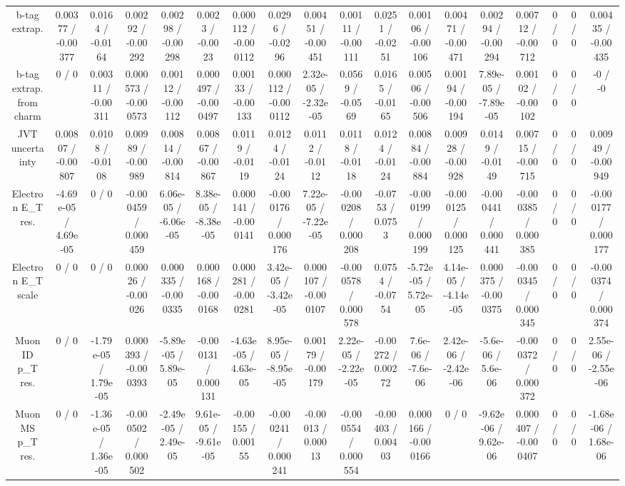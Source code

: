 \documentclass[10pt]{article}
\begin{document}
\begin{table}[htbp]
\begin{center}
\begin{tabular}{|c|c|c|c|c|c|c|c|c|c|c|c|c|c|c|c|c|c|}
  b-tag extrap. & 0.00377 / -0.00377 & 0.0164 / -0.0164 & 0.00292 / -0.00292 & 0.00298 / -0.00298 & 0.0023 / -0.0023 & 0.000112 / -0.000112 & 0.0296 / -0.0296 & 0.00451 / -0.00451 & 0.00111 / -0.00111 & 0.0251 / -0.0251 & 0.00106 / -0.00106 & 0.00471 / -0.00471 & 0.00294 / -0.00294 & 0.00712 / -0.00712 & 0 / 0 & 0 / 0 & 0.00435 / -0.00435 \\ 
  b-tag extrap. from charm & 0 / 0 & 0.00311 / -0.00311 & 0.000573 / -0.000573 & 0.00112 / -0.00112 & 0.000497 / -0.000497 & 0.00133 / -0.00133 & 0.000112 / -0.000112 & 2.32e-05 / -2.32e-05 & 0.0569 / -0.0569 & 0.0165 / -0.0165 & 0.00506 / -0.00506 & 0.00194 / -0.00194 & 7.89e-05 / -7.89e-05 & 0.00102 / -0.00102 & 0 / 0 & 0 / 0 & -0 / -0 \\ 
  JVT uncertainty & 0.00807 / -0.00807 & 0.0108 / -0.0108 & 0.00989 / -0.00989 & 0.00814 / -0.00814 & 0.00867 / -0.00867 & 0.0119 / -0.0119 & 0.0124 / -0.0124 & 0.0112 / -0.0112 & 0.0118 / -0.0118 & 0.0124 / -0.0124 & 0.00884 / -0.00884 & 0.00928 / -0.00928 & 0.0149 / -0.0149 & 0.00715 / -0.00715 & 0 / 0 & 0 / 0 & 0.00949 / -0.00949 \\ 
  Electron E_{T} res. & -4.69e-05 / 4.69e-05 & 0 / 0 & -0.000459 / 0.000459 & 6.06e-05 / -6.06e-05 & 8.38e-05 / -8.38e-05 & 0.000141 / -0.000141 & -0.000176 / 0.000176 & 7.22e-05 / -7.22e-05 & -0.000208 / 0.000208 & -0.0753 / 0.0753 & -0.000199 / 0.000199 & -0.000125 / 0.000125 & -0.000441 / 0.000441 & -0.000385 / 0.000385 & 0 / 0 & 0 / 0 & -0.000177 / 0.000177 \\ 
  Electron E_{T} scale & 0 / 0 & 0 / 0 & 0.00026 / -0.00026 & 0.000335 / -0.000335 & 0.000168 / -0.000168 & 0.000281 / -0.000281 & 3.42e-05 / -3.42e-05 & 0.000107 / -0.000107 & -0.000578 / 0.000578 & 0.0754 / -0.0754 & -5.72e-05 / 5.72e-05 & 4.14e-05 / -4.14e-05 & 0.000375 / -0.000375 & -0.000345 / 0.000345 & 0 / 0 & 0 / 0 & -0.000374 / 0.000374 \\ 
  Muon ID p_{T} res. & 0 / 0 & -1.79e-05 / 1.79e-05 & 0.000393 / -0.000393 & -5.89e-05 / 5.89e-05 & -0.000131 / 0.000131 & -4.63e-05 / 4.63e-05 & 8.95e-05 / -8.95e-05 & 0.00179 / -0.00179 & 2.22e-05 / -2.22e-05 & -0.00272 / 0.00272 & 7.6e-06 / -7.6e-06 & 2.42e-06 / -2.42e-06 & -5.6e-06 / 5.6e-06 & -0.000372 / 0.000372 & 0 / 0 & 0 / 0 & 2.55e-06 / -2.55e-06 \\ 
  Muon MS p_{T} res. & 0 / 0 & -1.36e-05 / 1.36e-05 & -0.000502 / 0.000502 & -2.49e-05 / 2.49e-05 & 9.61e-05 / -9.61e-05 & -0.00155 / 0.00155 & -0.000241 / 0.000241 & -0.00013 / 0.00013 & -0.000554 / 0.000554 & -0.00403 / 0.00403 & 0.000166 / -0.000166 & 0 / 0 & -9.62e-06 / 9.62e-06 & 0.000407 / -0.000407 & 0 / 0 & 0 / 0 & -1.68e-06 / 1.68e-06 \\ 

\end{tabular}
\end{center}
\end{table}
\end{document}
